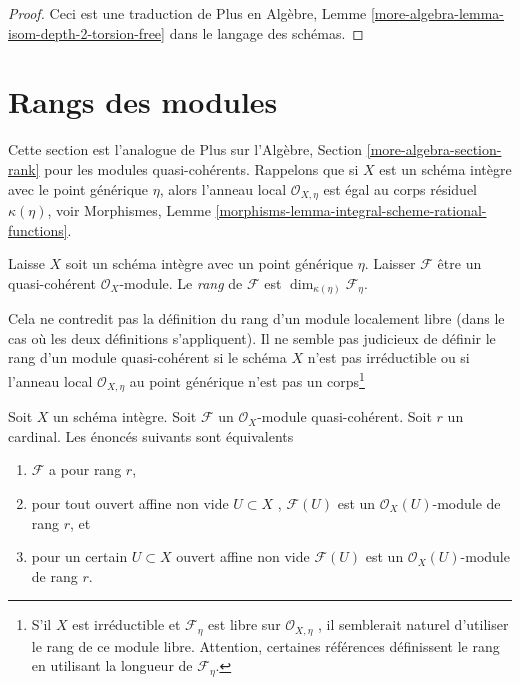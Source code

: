 \begin{proof}
Ceci est une traduction de Plus en Algèbre, Lemme  \ref{more-algebra-lemma-isom-depth-2-torsion-free}  dans le langage des
schémas.
\end{proof}








\section{Rangs des modules}
\label{section-rank}

\noindent
Cette section est l'analogue de Plus sur l'Algèbre, Section  \ref{more-algebra-section-rank}  pour les
modules quasi-cohérents. Rappelons que si  $X$  est un schéma intègre avec
le point générique  $\eta$, alors l'anneau local  $\mathcal{O}_{X, \eta}$  est égal au
corps résiduel  $\kappa(\eta)$, voir Morphismes, Lemme  \ref{morphisms-lemma-integral-scheme-rational-functions}.

\begin{definition}
\label{definition-rank}
Laisse $X$ soit un schéma intègre avec un point générique $\eta$.
Laisser  $\mathcal{F}$ être un quasi-cohérent $\mathcal{O}_X$-module. Le
 {\it rang}  de  $\mathcal{F}$  est  $\dim_{\kappa(\eta)} \mathcal{F}_\eta$.
\end{definition}

\noindent
Cela ne contredit pas la définition du rang d'un module localement libre (dans le
cas où les deux définitions s'appliquent). Il ne semble pas judicieux de définir
le rang d'un module quasi-cohérent si le schéma  $X$  n'est pas
irréductible ou si l'anneau local  $\mathcal{O}_{X, \eta}$  au point générique n'est pas un
corps\footnote{S'il  $X$  est irréductible et  $\mathcal{F}_\eta$ 
est libre sur  $\mathcal{O}_{X, \eta}$ , il semblerait naturel d'utiliser le rang de ce module
libre. Attention, certaines références définissent le rang en utilisant la
longueur de  $\mathcal{F}_\eta$.}

\begin{lemma}
\label{lemma-check-rank-on-affines}
Soit  $X$  un schéma intègre. Soit  $\mathcal{F}$  un  $\mathcal{O}_X$-module
quasi-cohérent. Soit  $r$  un cardinal. Les énoncés suivants sont
équivalents
\begin{enumerate}
\item $\mathcal{F}$  a pour rang  $r$,
\item pour tout ouvert affine non vide  $U \subset X$ ,  $\mathcal{F}(U)$  est un
 $\mathcal{O}_X(U)$-module de rang  $r$, et
\item pour un certain  $U \subset X$  ouvert affine non vide  $\mathcal{F}(U)$  est un
 $\mathcal{O}_X(U)$-module de rang  $r$.
\end{enumerate}
\end{lemma}

